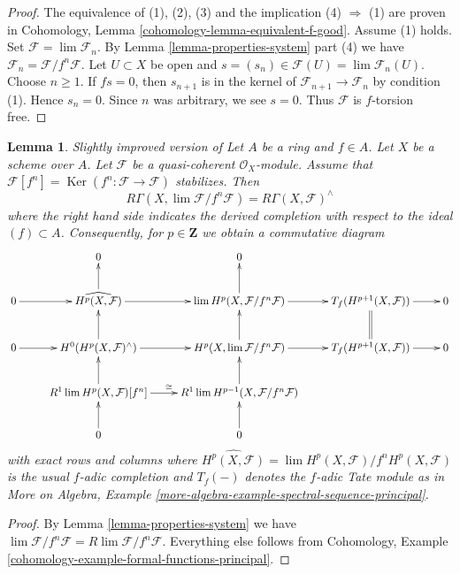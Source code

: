 \documentclass{stacks-project}
\newenvironment{reference}{\comment}{\endcomment}
\theoremstyle{plain}
\newtheorem{lemma}[subsection]{Lemma}
\theoremstyle{definition}
\theoremstyle{remark}
\numberwithin{equation}{subsection}
\def\lim{\mathop{\mathrm{lim}}\nolimits}
\def\Ker{\mathop{\mathrm{Ker}}}
\begin{document}
\begin{proof}
The equivalence of (1), (2), (3) and the implication (4) $\Rightarrow$ (1)
are proven in Cohomology, Lemma \ref{cohomology-lemma-equivalent-f-good}.
Assume (1) holds. Set
$\mathcal{F} = \lim \mathcal{F}_n$. By Lemma \ref{lemma-properties-system}
part (4) we have $\mathcal{F}_n = \mathcal{F}/f^n\mathcal{F}$.
Let $U \subset X$ be open and
$s = (s_n) \in \mathcal{F}(U) = \lim \mathcal{F}_n(U)$.
Choose $n \geq 1$. If $fs = 0$, then $s_{n + 1}$ is in the kernel of
$\mathcal{F}_{n + 1} \to \mathcal{F}_n$ by condition (1).
Hence $s_n = 0$. Since $n$ was arbitrary, we see $s = 0$.
Thus $\mathcal{F}$ is $f$-torsion free.
\end{proof}

\begin{lemma}
\label{lemma-formal-functions-principal}
\begin{reference}
Slightly improved version of \cite[Lemma 1.6]{Bhatt-local}
\end{reference}
Let $A$ be a ring and $f \in A$. Let $X$ be a scheme over $A$.
Let $\mathcal{F}$ be a quasi-coherent $\mathcal{O}_X$-module.
Assume that $\mathcal{F}[f^n] = \Ker(f^n : \mathcal{F} \to \mathcal{F})$
stabilizes. Then
$$
R\Gamma(X, \lim \mathcal{F}/f^n\mathcal{F}) =
R\Gamma(X, \mathcal{F})^\wedge
$$
where the right hand side indicates the derived completion
with respect to the ideal $(f) \subset A$. Consequently, for
$p \in \mathbf{Z}$ we obtain a commutative diagram
$$
\xymatrix{
& 0 & 0 \\
0 \ar[r] &
\widehat{H^p(X, \mathcal{F})} \ar[r] \ar[u] &
\lim H^p(X, \mathcal{F}/f^n\mathcal{F}) \ar[r] \ar[u] &
T_f(H^{p + 1}(X, \mathcal{F})) \ar[r] &
0 \\
0 \ar[r] &
H^0(H^p(X, \mathcal{F})^\wedge) \ar[r] \ar[u] &
H^p(X, \lim \mathcal{F}/f^n\mathcal{F}) \ar[r] \ar[u] &
T_f(H^{p + 1}(X, \mathcal{F})) \ar[r] \ar@{=}[u] &
0 \\
&
R^1\lim H^p(X, \mathcal{F})[f^n] \ar[u] \ar[r]^\cong &
R^1\lim H^{p - 1}(X, \mathcal{F}/f^n\mathcal{F}) \ar[u] \\
& 0 \ar[u] & 0 \ar[u]
}
$$
with exact rows and columns where
$\widehat{H^p(X, \mathcal{F})} =
\lim H^p(X, \mathcal{F})/f^n H^p(X, \mathcal{F})$
is the usual $f$-adic completion
and $T_f(-)$ denotes the $f$-adic Tate module as in
More on Algebra, Example
\ref{more-algebra-example-spectral-sequence-principal}.
\end{lemma}

\begin{proof}
By Lemma \ref{lemma-properties-system} we have
$\lim \mathcal{F}/f^n\mathcal{F} = R\lim \mathcal{F}/f^n \mathcal{F}$.
Everything else follows from Cohomology, Example
\ref{cohomology-example-formal-functions-principal}.
\end{proof}
\end{document}
